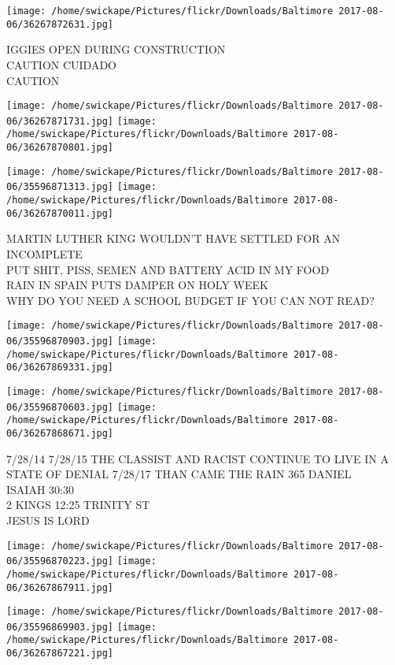 \documentclass[10pt,letterpaper]{article}
\begin{document}
\vspace{0.25in}
\texttt{[image: /home/swickape/Pictures/flickr/Downloads/Baltimore 2017-08-06/36267872631.jpg]}

IGGIES OPEN DURING CONSTRUCTION\\
CAUTION CUIDADO\\
CAUTION
\pagebreak

\texttt{[image: /home/swickape/Pictures/flickr/Downloads/Baltimore 2017-08-06/36267871731.jpg]}
\texttt{[image: /home/swickape/Pictures/flickr/Downloads/Baltimore 2017-08-06/36267870801.jpg]}

\texttt{[image: /home/swickape/Pictures/flickr/Downloads/Baltimore 2017-08-06/35596871313.jpg]}
\texttt{[image: /home/swickape/Pictures/flickr/Downloads/Baltimore 2017-08-06/36267870011.jpg]}

MARTIN LUTHER KING WOULDN'T HAVE SETTLED FOR AN INCOMPLETE\\
PUT SHIT, PISS, SEMEN AND BATTERY ACID IN MY FOOD\\
RAIN IN SPAIN PUTS DAMPER ON HOLY WEEK\\
WHY DO YOU NEED A SCHOOL BUDGET IF YOU CAN NOT READ?
\pagebreak

\texttt{[image: /home/swickape/Pictures/flickr/Downloads/Baltimore 2017-08-06/35596870903.jpg]}
\texttt{[image: /home/swickape/Pictures/flickr/Downloads/Baltimore 2017-08-06/36267869331.jpg]}

\texttt{[image: /home/swickape/Pictures/flickr/Downloads/Baltimore 2017-08-06/35596870603.jpg]}
\texttt{[image: /home/swickape/Pictures/flickr/Downloads/Baltimore 2017-08-06/36267868671.jpg]}

7/28/14 7/28/15 THE CLASSIST AND RACIST CONTINUE TO LIVE IN A STATE OF DENIAL 7/28/17 THAN CAME THE RAIN 365 DANIEL\\
ISAIAH 30:30\\
2 KINGS 12:25 TRINITY ST\\
JESUS IS LORD
\pagebreak

\texttt{[image: /home/swickape/Pictures/flickr/Downloads/Baltimore 2017-08-06/35596870223.jpg]}
\texttt{[image: /home/swickape/Pictures/flickr/Downloads/Baltimore 2017-08-06/36267867911.jpg]}

\texttt{[image: /home/swickape/Pictures/flickr/Downloads/Baltimore 2017-08-06/35596869903.jpg]}
\texttt{[image: /home/swickape/Pictures/flickr/Downloads/Baltimore 2017-08-06/36267867221.jpg]}
\end{document}
